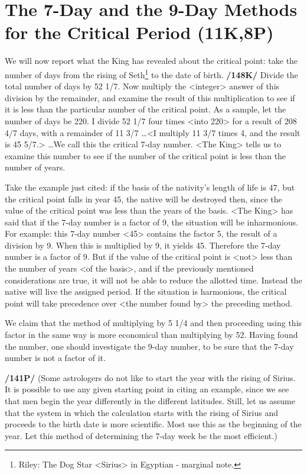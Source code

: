 \section{The 7-Day and the 9-Day Methods for the Critical Period (11K,8P)}

We will now report what the King has revealed about the critical point: take the number of days from the rising of Seth\footnote{Riley: The Dog Star <Sirius> in Egyptian - marginal note.} to the date of birth. \textbf{/148K/} Divide the total number of days by 52 1/7. Now multiply the <integer> answer of this division by the remainder, and examine the result of this multiplication to see if it is less than the particular number of the critical point. As a sample, let the number of days be 220. I divide 52 1/7 four times <into 220> for a result of 208 4/7 days, with a remainder of 11 3/7 \ldots <I multiply 11 3/7 times 4, and the result is 45 5/7.> \ldots We call this the critical 7-day number.
<The King> tells us to examine this number to see if the number of the critical point is less than the number of years. 

Take the example just cited: if the basis of the nativity’s length of life is 47, but the critical point falls in year 45, the native will be destroyed then, since the value of the critical point was less than the years of the basis. <The King> has said that if the 7-day number is a factor of 9, the situation will be inharmonious. For example: this 7-day number <45> contains the factor 5, the result of a division by
9. When this is multiplied by 9, it yields 45. Therefore the 7-day number is a factor of 9. But if the value of the critical point is <not> less than the number of years <of the basis>, and if the previously mentioned considerations are true, it will not be able to reduce the allotted time. Instead the native will live the assigned period. If the situation is harmonious, the critical point will take precedence over <the
number found by> the preceding method.

We claim that the method of multiplying by 5 1/4 and then proceeding using this factor in the same way is more economical than multiplying by 52. Having found the number, one should investigate the 9-day number, to be sure that the 7-day number is not a factor of it.

\textbf{/141P/} (Some astrologers do not like to start the year with the rising of Sirius. It is possible to use any given starting point in citing an example, since we see that men begin the year differently in the different latitudes. Still, let us assume that the system in which the calculation starts with the rising of Sirius and proceeds to the birth date is more scientific. Most use this as the beginning of the year. Let this method of determining the 7-day week be the most efficient.)

